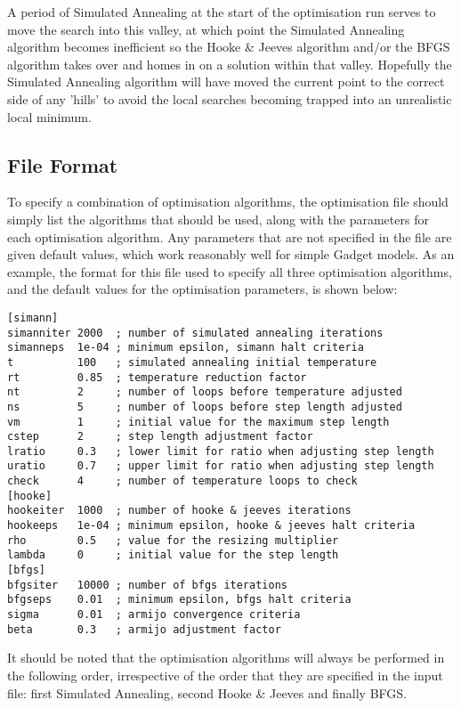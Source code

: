\documentclass[10pt,twoside]{book}
\begin{document}
\bigskip
A period of Simulated Annealing at the start of the optimisation run serves to move the search into this valley, at which point the Simulated Annealing algorithm becomes inefficient so the Hooke \& Jeeves algorithm and/or the BFGS algorithm takes over and homes in on a solution within that valley.  Hopefully the Simulated Annealing algorithm will have moved the current point to the correct side of any 'hills' to avoid the local searches becoming trapped into an unrealistic local minimum.

\subsection{File Format}\label{subsec:combinefile}
To specify a combination of optimisation algorithms, the optimisation file should simply list the algorithms that should be used, along with the parameters for each optimisation algorithm.  Any parameters that are not specified in the file are given default values, which work reasonably well for simple Gadget models.  As an example, the format for this file used to specify all three optimisation algorithms, and the default values for the optimisation parameters, is shown below:

{\small\begin{verbatim}
[simann]
simanniter 2000  ; number of simulated annealing iterations
simanneps  1e-04 ; minimum epsilon, simann halt criteria
t          100   ; simulated annealing initial temperature
rt         0.85  ; temperature reduction factor
nt         2     ; number of loops before temperature adjusted
ns         5     ; number of loops before step length adjusted
vm         1     ; initial value for the maximum step length
cstep      2     ; step length adjustment factor
lratio     0.3   ; lower limit for ratio when adjusting step length
uratio     0.7   ; upper limit for ratio when adjusting step length
check      4     ; number of temperature loops to check
[hooke]
hookeiter  1000  ; number of hooke & jeeves iterations
hookeeps   1e-04 ; minimum epsilon, hooke & jeeves halt criteria
rho        0.5   ; value for the resizing multiplier
lambda     0     ; initial value for the step length
[bfgs]
bfgsiter   10000 ; number of bfgs iterations
bfgseps    0.01  ; minimum epsilon, bfgs halt criteria
sigma      0.01  ; armijo convergence criteria
beta       0.3   ; armijo adjustment factor
\end{verbatim}}

It should be noted that the optimisation algorithms will always be performed in the following order, irrespective of the order that they are specified in the input file: first Simulated Annealing, second Hooke \& Jeeves and finally BFGS.
\end{document}

